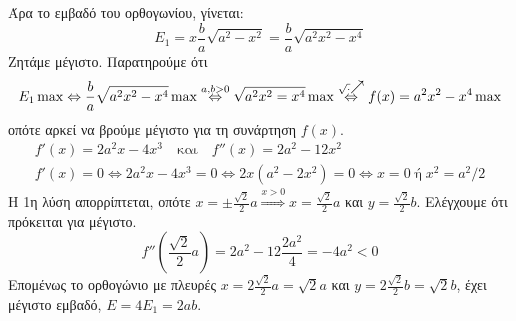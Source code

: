\documentclass[a4paper,table]{report}
\begin{document}
\begin{solution}
    Άρα το εμβαδό του ορθογωνίου, γίνεται:
    \[
      E_{1}=x  \frac{b}{a} \sqrt{ a^{2}-x^{2}} = \frac{b}{a} \sqrt{a^{2}x^{2}-x^{4}}
    \]
  Ζητάμε μέγιστο. Παρατηρούμε ότι 
  \[ 
    E_{1} \max \Leftrightarrow
    \frac{b}{a} \sqrt{a^{2}x^{2}-x^{4}} \max \overset{a,b>0}{\Leftrightarrow}
    \sqrt{a^{2}x^{2}=x^{4}} \max
    \overset{\sqrt{\cdot}\raisebox{1pt}{$\nearrow$}}{\Leftrightarrow} 
    f(x)=a^{2}x^{2}-x^{4} \max 
  \] 
  οπότε αρκεί να βρούμε μέγιστο για τη συνάρτηση $ f(x) $.
  \begin{gather*}
    f'(x)=2a^{2}x-4x^{3} \quad \text{και} \quad f''(x)=2a^{2}-12x^{2} \\
    f'(x)=0 \Leftrightarrow 2a^{2}x-4x^{3}=0 \Leftrightarrow 2x(a^{2}-2x^{2})=0
    \Leftrightarrow x = 0 \; \text{ή} \; x^{2}= a^{2}/2
  \end{gather*} 
  Η 1η λύση απορρίπτεται, οπότε $ x= \pm \frac{\sqrt{2}}{2} a \overset{x>0}{\Rightarrow}
  x = \frac{\sqrt{2}}{2} a $ και $ y= \frac{\sqrt{2}}{2} b $. Ελέγχουμε ότι πρόκειται 
  για μέγιστο.
  \[
    f''\left(\frac{\sqrt{2}}{2} a\right) = 2a^{2}-12 \frac{2a^{2}}{4} = - 4a^{2}<0
  \] 
  Επομένως το ορθογώνιο με πλευρές $ x= 2 \frac{\sqrt{2}}{2} a = \sqrt{2} a $ και 
  $ y = 2 \frac{\sqrt{2}}{2} b = \sqrt{2} b $, έχει μέγιστο εμβαδό, $ E=4E_{1} = 2ab $.
\end{solution}
\end{document}
